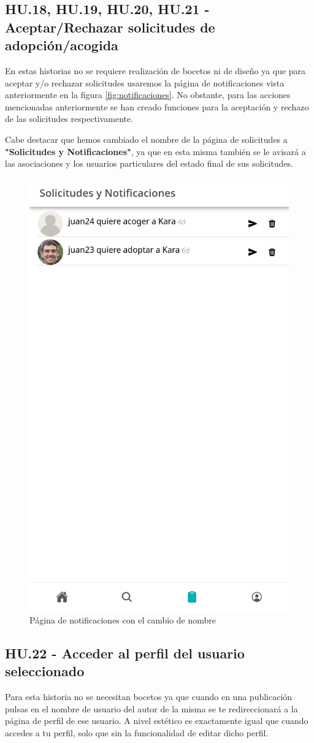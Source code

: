 \subsection{HU.18, HU.19, HU.20, HU.21 - Aceptar/Rechazar solicitudes de adopción/acogida }

En estas historias no se requiere realización de bocetos ni de diseño ya que para aceptar y/o rechazar solicitudes usaremos la página de notificaciones vista anteriormente en la figura \ref{fig:notificaciones}. No obstante, para las acciones mencionadas anteriormente se han creado funciones para la aceptación y rechazo de las solicitudes respectivamente. 

Cabe destacar que hemos cambiado el nombre de la página de solicitudes a \textbf{"Solicitudes y Notificaciones"}, ya que en esta misma también se le avisará a las asociaciones y los usuarios particulares del estado final de sus solicitudes.

\begin{figure}[H]
	\centering
	\includegraphics[width=0.5\linewidth]{"sprint 4/hu17/notificacionesNueva"}
	\caption{Página de notificaciones con el cambio de nombre}
	\label{fig:notificacionesnueva}
\end{figure}

\subsection{HU.22 - Acceder al perfil del usuario seleccionado}

Para esta historia no se necesitan bocetos ya que cuando en una publicación pulsas en el nombre de usuario del autor de la misma se te redireccionará a la página de perfil de ese usuario. A nivel estético es exactamente igual que cuando accedes a tu perfil, solo que sin la funcionalidad de editar dicho perfil.

